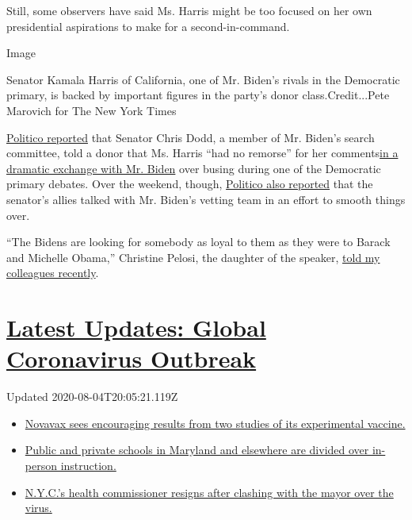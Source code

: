 Still, some observers have said Ms. Harris might be too focused on her
own presidential aspirations to make for a second-in-command.

Image

Senator Kamala Harris of California, one of Mr. Biden's rivals in the
Democratic primary, is backed by important figures in the party's donor
class.Credit...Pete Marovich for The New York Times

\href{https://www.politico.com/news/2020/07/27/kamala-harris-biden-vp-381829}{Politico
reported} that Senator Chris Dodd, a member of Mr. Biden's search
committee, told a donor that Ms. Harris ``had no remorse'' for her
comments\href{https://www.nytimes3xbfgragh.onion/2019/06/28/us/kamala-harris-debate.html}{in
a dramatic exchange with Mr. Biden} over busing during one of the
Democratic primary debates. Over the weekend, though,
\href{https://www.politico.com/news/2020/07/31/harris-allies-biden-call-dodd-389848}{Politico
also reported} that the senator's allies talked with Mr. Biden's vetting
team in an effort to smooth things over.

``The Bidens are looking for somebody as loyal to them as they were to
Barack and Michelle Obama,'' Christine Pelosi, the daughter of the
speaker,
\href{https://www.nytimes3xbfgragh.onion/2020/07/31/us/politics/joseph-biden-vice-president.html}{told
my colleagues recently}.

\hypertarget{latest-updates-global-coronavirus-outbreak}{%
\section{\texorpdfstring{\href{https://www.nytimes3xbfgragh.onion/2020/08/04/world/coronavirus-cases.html?action=click\&pgtype=Article\&state=default\&region=MAIN_CONTENT_1\&context=storylines_live_updates}{Latest
Updates: Global Coronavirus
Outbreak}}{Latest Updates: Global Coronavirus Outbreak}}\label{latest-updates-global-coronavirus-outbreak}}

Updated 2020-08-04T20:05:21.119Z

\begin{itemize}
\tightlist
\item
  \href{https://www.nytimes3xbfgragh.onion/2020/08/04/world/coronavirus-cases.html?action=click\&pgtype=Article\&state=default\&region=MAIN_CONTENT_1\&context=storylines_live_updates\#link-1228a480}{Novavax
  sees encouraging results from two studies of its experimental
  vaccine.}
\item
  \href{https://www.nytimes3xbfgragh.onion/2020/08/04/world/coronavirus-cases.html?action=click\&pgtype=Article\&state=default\&region=MAIN_CONTENT_1\&context=storylines_live_updates\#link-4825b93}{Public
  and private schools in Maryland and elsewhere are divided over
  in-person instruction.}
\item
  \href{https://www.nytimes3xbfgragh.onion/2020/08/04/world/coronavirus-cases.html?action=click\&pgtype=Article\&state=default\&region=MAIN_CONTENT_1\&context=storylines_live_updates\#link-4d1eafa8}{N.Y.C.'s
  health commissioner resigns after clashing with the mayor over the
  virus.}
\end{itemize}


